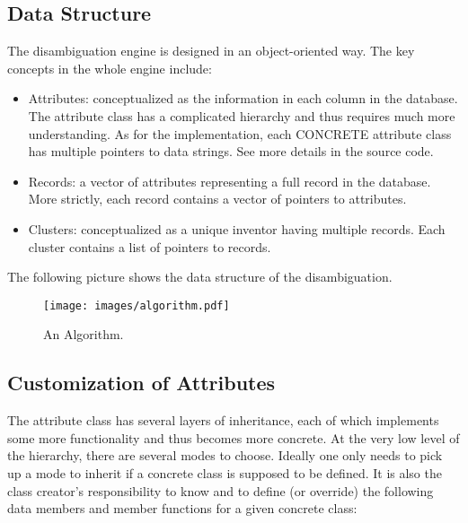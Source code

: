 \documentclass{article}
\begin{document}
\subsection{Data Structure}


The disambiguation engine is designed in an object-oriented 
way. The key concepts in the whole engine include:


\begin{itemize}

\item Attributes: conceptualized as the information in each 
column in the database. The attribute class has a complicated 
hierarchy and thus requires much more understanding. As for the
implementation, each CONCRETE attribute class has multiple 
pointers to data strings. See more details in the source code.

\item Records: a vector of attributes representing a full 
record in the database. More strictly, each
record contains a vector of pointers to attributes.

\item Clusters: conceptualized as a unique inventor having 
multiple records. Each cluster contains a list of
pointers to records.

\end{itemize}


The following picture shows the data structure of the disambiguation.


\begin{figure}
\begin{center}
\texttt{[image: images/algorithm.pdf]}
\caption{An Algorithm.}
\label{fig:algorithm}
\end{center}
\end{figure}


\subsection{Customization of Attributes}


The attribute class has several layers of inheritance, 
each of which implements some more functionality and thus 
becomes more concrete. At the  very low level of the 
hierarchy, there are several modes to choose. Ideally one 
only needs to pick up a mode to inherit if a concrete class 
is supposed to be defined. It is also the class creator's 
responsibility to know and to define (or override) the 
following data members and member functions for a 
given concrete class:
\end{document}
